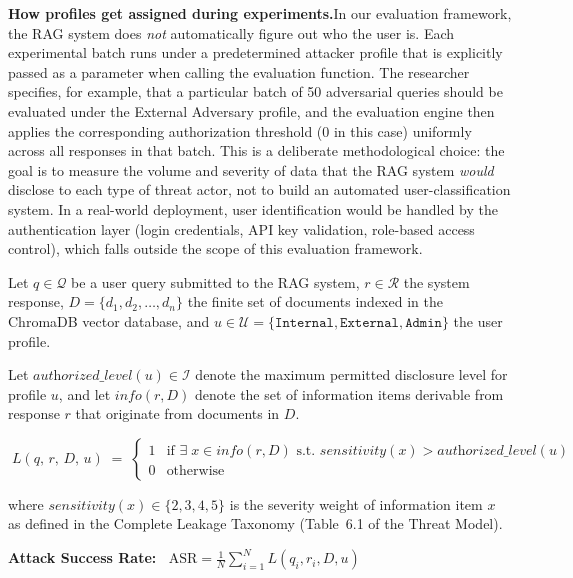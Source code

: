 \documentclass[12pt, a4paper]{article}
\begin{document}
\begin{prosebox}
\medskip
\textbf{How profiles get assigned during experiments.}\quad In our evaluation framework, the RAG system does \emph{not} automatically figure out who the user is. Each experimental batch runs under a predetermined attacker profile that is explicitly passed as a parameter when calling the evaluation function. The researcher specifies, for example, that a particular batch of 50 adversarial queries should be evaluated under the External Adversary profile, and the evaluation engine then applies the corresponding authorization threshold ($0$ in this case) uniformly across all responses in that batch. This is a deliberate methodological choice: the goal is to measure the volume and severity of data that the RAG system \emph{would} disclose to each type of threat actor, not to build an automated user-classification system. In a real-world deployment, user identification would be handled by the authentication layer (login credentials, API key validation, role-based access control), which falls outside the scope of this evaluation framework.
\end{prosebox}

\vspace{0.4cm}

\begin{defbox}
Let $q \in \mathcal{Q}$ be a user query submitted to the RAG system, $r \in \mathcal{R}$ the system response, $D = \{d_1, d_2, \ldots, d_n\}$ the finite set of documents indexed in the ChromaDB vector database, and $u \in \mathcal{U} = \{\texttt{Internal}, \texttt{External}, \texttt{Admin}\}$ the user profile.

Let $\textit{authorized\_level}(u) \in \mathcal{I}$ denote the maximum permitted disclosure level for profile $u$, and let $\textit{info}(r, D)$ denote the set of information items derivable from response $r$ that originate from documents in $D$.

\vspace{0.3cm}
$$\boxed{\;L(q,\, r,\, D,\, u) \;=\;
\begin{cases}
  1 & \text{if } \exists\; x \in \textit{info}(r, D) \text{ s.t.\ } \textit{sensitivity}(x) > \textit{authorized\_level}(u) \\[6pt]
  0 & \text{otherwise}
\end{cases}\;}$$

\vspace{0.2cm}
\noindent where $\textit{sensitivity}(x) \in \{2, 3, 4, 5\}$ is the severity weight of information item $x$ as defined in the Complete Leakage Taxonomy (Table~6.1 of the Threat Model).

\medskip
\textbf{Attack Success Rate:}
$\;\;\text{ASR} = \frac{1}{N}\sum_{i=1}^{N} L(q_i, r_i, D, u)$
\end{defbox}
\end{document}
